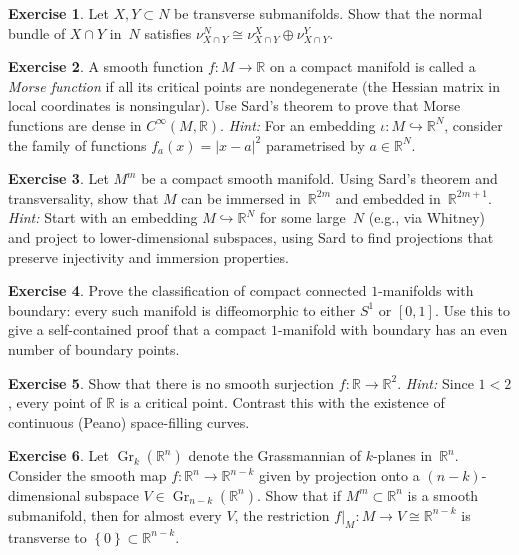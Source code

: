 \documentclass[12pt,a4paper,openany]{book}
\theoremstyle{definition}
\newtheorem{exercise}{Exercise}[chapter]
\theoremstyle{remark}
\newcommand{\R}{\mathbb{R}}
\newcommand{\abs}[1]{\left\lvert #1 \right\rvert}
\newcommand{\set}[1]{\left\{ #1 \right\}}
\begin{document}
\begin{exercise}\label{exo:normal-bundle-transverse}
Let $X,Y\subset N$ be transverse submanifolds.  Show that the normal
bundle of $X\cap Y$ in~$N$ satisfies
$\nu_{X\cap Y}^N \cong \nu_{X\cap Y}^X \oplus \nu_{X\cap Y}^Y$.
\end{exercise}

\begin{exercise}\label{exo:morse-regular}
A smooth function $f\colon M\to\R$ on a compact manifold is called a
\emph{Morse function} if all its critical points are
nondegenerate (the Hessian matrix in local coordinates is nonsingular).
Use Sard's theorem to prove that Morse functions are dense in
$C^\infty(M,\R)$.  \emph{Hint:} For an embedding
$\iota\colon M\hookrightarrow\R^N$, consider the family of functions
$f_a(x) = \abs{x-a}^2$ parametrised by $a\in\R^N$.
\end{exercise}

\begin{exercise}\label{exo:whitney-embedding}
Let $M^m$ be a compact smooth manifold.  Using Sard's theorem and
transversality, show that $M$ can be immersed in~$\R^{2m}$ and
embedded in~$\R^{2m+1}$.
\emph{Hint:} Start with an embedding $M\hookrightarrow\R^N$
for some large~$N$ (e.g., via Whitney) and project to lower-dimensional
subspaces, using Sard to find projections that preserve injectivity
and immersion properties.
\end{exercise}

\begin{exercise}\label{exo:compact-one-manifolds}
Prove the classification of compact connected $1$-manifolds with
boundary: every such manifold is diffeomorphic to either $S^1$ or
$[0,1]$.  Use this to give a self-contained proof that a compact
$1$-manifold with boundary has an even number of boundary points.
\end{exercise}

\begin{exercise}\label{exo:sard-space-filling}
Show that there is no smooth surjection $f\colon\R\to\R^2$.
\emph{Hint:} Since $1 < 2$, every point of $\R$ is a critical point.
Contrast this with the existence of continuous (Peano) space-filling
curves.
\end{exercise}

\begin{exercise}\label{exo:transverse-grassmannian}
Let $\operatorname{Gr}_k(\R^n)$ denote the Grassmannian of $k$-planes
in~$\R^n$.  Consider the smooth map $f\colon\R^n\to\R^{n-k}$ given by
projection onto a $(n-k)$-dimensional subspace $V\in\operatorname{Gr}_{n-k}(\R^n)$.
Show that if $M^m\subset\R^n$ is a smooth submanifold, then for almost
every $V$, the restriction $f|_M\colon M\to V\cong\R^{n-k}$ is
transverse to $\set{0}\subset\R^{n-k}$.
\end{exercise}
\end{document}

